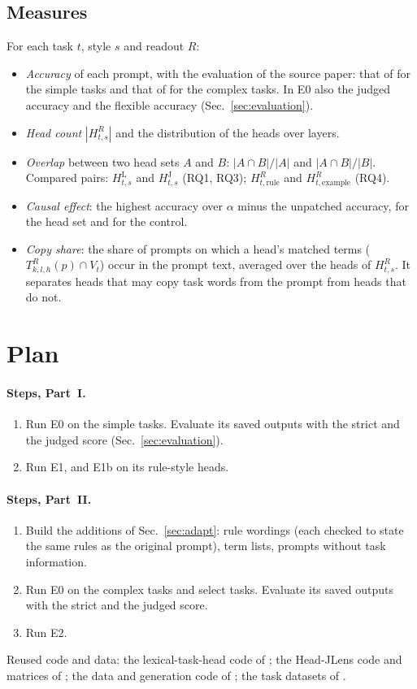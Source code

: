 \documentclass[11pt,a4paper]{article}
\begin{document}
\subsection{Measures}\label{sec:measures}
For each task $t$, style $s$ and readout $R$:
\begin{itemize}
\item \emph{Accuracy} of each prompt, with the evaluation of the source paper: that of \citet{yang2026shared} for the simple tasks and that of \citet{fu2026rules} for the complex tasks. In E0 also the judged accuracy and the flexible accuracy (Sec.~\ref{sec:evaluation}).
\item \emph{Head count} $|H^{R}_{t,s}|$ and the distribution of the heads over layers.
\item \emph{Overlap} between two head sets $A$ and $B$: $|A\cap B|/|A|$ and $|A\cap B|/|B|$. Compared pairs: $H^{\mathrm{L}}_{t,s}$ and $H^{\mathrm{J}}_{t,s}$ (RQ1, RQ3); $H^{R}_{t,\text{rule}}$ and $H^{R}_{t,\text{example}}$ (RQ4).
\item \emph{Causal effect}: the highest accuracy over $\alpha$ minus the unpatched accuracy, for the head set and for the control.
\item \emph{Copy share}: the share of prompts on which a head's matched terms ($T^{R}_{k,l,h}(p)\cap V_t$) occur in the prompt text, averaged over the heads of $H^{R}_{t,s}$. It separates heads that may copy task words from the prompt from heads that do not.
\end{itemize}

\section{Plan}\label{sec:plan}
\paragraph{Steps, Part~I.}
\begin{enumerate}
\item Run E0 on the simple tasks. Evaluate its saved outputs with the strict and the judged score (Sec.~\ref{sec:evaluation}).
\item Run E1, and E1b on its rule-style heads.
\end{enumerate}
\paragraph{Steps, Part~II.}
\begin{enumerate}
\item Build the additions of Sec.~\ref{sec:adapt}: rule wordings (each checked to state the same rules as the original prompt), term lists, prompts without task information.
\item Run E0 on the complex tasks and select tasks. Evaluate its saved outputs with the strict and the judged score.
\item Run E2.
\end{enumerate}
Reused code and data: the lexical-task-head code of \citet{yang2026shared}; the Head-JLens code and matrices of \citet{merlo2026headjlens}; the data and generation code of \citet{fu2026rules}; the task datasets of \citet{todd2024function}.
\end{document}
